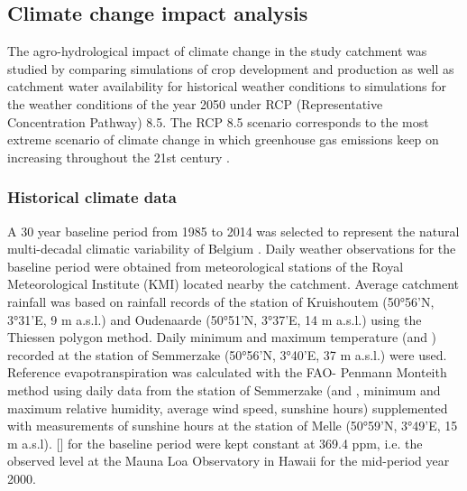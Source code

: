 \subsection{Climate change impact analysis}
The agro-hydrological impact of climate change in the study catchment was studied by comparing simulations of crop development and production as well as catchment water availability for historical weather conditions to simulations for the weather conditions of the year 2050 under RCP (Representative Concentration Pathway) 8.5. The RCP 8.5 scenario corresponds to the most extreme scenario of climate change in which greenhouse gas emissions keep on increasing throughout the 21st century  \parencite{meinshausen2011}. 

\subsubsection{Historical climate data}
A 30 year baseline period from 1985 to 2014 was selected to represent the natural multi-decadal climatic variability of Belgium \parencite{willems2013, willems2013a}. Daily weather observations for the baseline period were obtained from meteorological stations of the Royal Meteorological Institute (KMI) located nearby the catchment. Average catchment rainfall was based on rainfall records of the station of Kruishoutem (50°56'N, 3°31'E, 9 m a.s.l.) and Oudenaarde (50°51'N, 3°37'E, 14 m a.s.l.) using the Thiessen polygon method. Daily minimum and maximum temperature (\Tmin and \Tmax) recorded at the station of Semmerzake (50°56'N, 3°40'E, 37 m a.s.l.) were used. Reference evapotranspiration was calculated with the FAO- Penmann Monteith method using daily data from the station of Semmerzake (\Tmin and \Tmax, minimum and maximum relative humidity, average wind speed, sunshine hours) supplemented with measurements of sunshine hours at the station of Melle (50°59'N, 3°49'E, 15 m a.s.l). [\COtwo] for the baseline period were kept constant at 369.4 ppm, i.e. the observed level at the Mauna Loa Observatory in Hawaii for the mid-period year 2000. 

